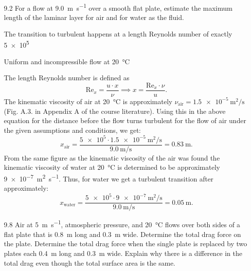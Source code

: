 
\begin{problem}{9.2}
  For a flow at \qty{9,0}{\m\per\s} over a smooth flat plate, estimate the maximum length of the laminar layer for air and for water as the fluid.
\end{problem}

\begin{assumptions}
  \item The transition to turbulent happens at a length Reynolds number of exactly \num{5e5}
  \item Uniform and incompressible flow at \qty{20}{\celsius} 
\end{assumptions}

\begin{derivation}
  The length Reynolds number is defined as
  \begin{equation*}
    \mathrm{Re}_x = \frac{u \cdot x}{\nu} \implies x = \frac{\mathrm{Re}_x \cdot \nu}{u}
  .\end{equation*}
  The kinematic viscosity of air at \qty{20}{\celsius} is approximately $\nu_{\text{air}} = \qty{1,5e-5}{\m\squared\per\s}$ (Fig. A.3. in Appendix A of the course literature).
  Using this in the above equation for the distance before the flow turns turbulent for the flow of air under the given assumptions and conditions, we get:
  \begin{equation*}
    x_{\text{air}} = \frac{\num{5e5} \cdot \qty{1,5e-5}{\m\squared\per\s} }{\qty{9,0}{\m\per\s}} = \qty{0,83}{\m} 
  .\end{equation*}
  From the same figure as the kinematic viscosity of the air was found the kinematic viscosity of water at \qty{20}{\celsius} is determined to be approximately \qty{9e-7}{\m\squared\per\s}.
  Thus, for water we get a turbulent transition after approximately:
\begin{equation*}
  x_{\text{water}} = \frac{\num{5e5} \cdot \qty{9e-7}{\m\squared\per\s}}{\qty{9,0}{\m\per\s}} =   \qty{0,05}{\m} 
.\end{equation*}
\end{derivation}


\begin{problem}{9.8}
  Air at \qty{5}{\m\per\s}, atmospheric pressure, and \qty{20}{\celsius} flows over both sides of a flat plate that is \qty{0,8}{\m} long and \qty{0,3}{\m} wide.
  Determine the total drag force on the plate.
  Determine the total drag force when the single plate is replaced by two plates each \qty{0,4}{\m} long and \qty{0,3}{\m} wide.
  Explain why there is a difference in the total drag even though the total surface area is the same.
\end{problem}

